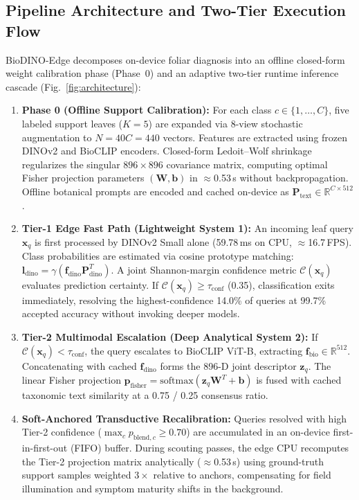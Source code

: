 \documentclass[preprint,12pt]{elsarticle}
\begin{document}
\subsection{Pipeline Architecture and Two-Tier Execution Flow}
\label{sec:system_architecture}
BioDINO-Edge decomposes on-device foliar diagnosis into an offline closed-form weight calibration phase (Phase~0) and an adaptive two-tier runtime inference cascade (Fig.~\ref{fig:architecture}):
\begin{enumerate}
    \item \textbf{Phase 0 (Offline Support Calibration):} For each class $c \in \{1, \dots, C\}$, five labeled support leaves ($K=5$) are expanded via 8-view stochastic augmentation to $N = 40C = 440$ vectors. Features are extracted using frozen DINOv2 and BioCLIP encoders. Closed-form Ledoit--Wolf shrinkage regularizes the singular $896 \times 896$ covariance matrix, computing optimal Fisher projection parameters $(\mathbf{W}, \mathbf{b})$ in $\approx$0.53\,s without backpropagation. Offline botanical prompts are encoded and cached on-device as $\mathbf{P}_{\text{text}} \in \mathbb{R}^{C \times 512}$.
    \item \textbf{Tier-1 Edge Fast Path (Lightweight System 1):} An incoming leaf query $\mathbf{x}_q$ is first processed by DINOv2 Small alone (59.78\,ms on CPU, $\approx$16.7\,FPS). Class probabilities are estimated via cosine prototype matching: $\mathbf{l}_{\text{dino}} = \gamma (\mathbf{f}_{\text{dino}}\mathbf{P}_{\text{dino}}^T)$. A joint Shannon-margin confidence metric $\mathcal{C}(\mathbf{x}_q)$ evaluates prediction certainty. If $\mathcal{C}(\mathbf{x}_q) \ge \tau_{\text{conf}}$ (0.35), classification exits immediately, resolving the highest-confidence 14.0\% of queries at 99.7\% accepted accuracy without invoking deeper models.
    \item \textbf{Tier-2 Multimodal Escalation (Deep Analytical System 2):} If $\mathcal{C}(\mathbf{x}_q) < \tau_{\text{conf}}$, the query escalates to BioCLIP ViT-B, extracting $\mathbf{f}_{\text{bio}} \in \mathbb{R}^{512}$. Concatenating with cached $\mathbf{f}_{\text{dino}}$ forms the 896-D joint descriptor $\mathbf{z}_q$. The linear Fisher projection $\mathbf{p}_{\text{fisher}} = \text{softmax}(\mathbf{z}_q \mathbf{W}^T + \mathbf{b})$ is fused with cached taxonomic text similarity at a 0.75 / 0.25 consensus ratio.
    \item \textbf{Soft-Anchored Transductive Recalibration:} Queries resolved with high Tier-2 confidence ($\max_c p_{\text{blend}, c} \ge 0.70$) are accumulated in an on-device first-in-first-out (FIFO) buffer. During scouting passes, the edge CPU recomputes the Tier-2 projection matrix analytically ($\approx$0.53\,s) using ground-truth support samples weighted $3\times$ relative to anchors, compensating for field illumination and symptom maturity shifts in the background.
\end{enumerate}
\end{document}
